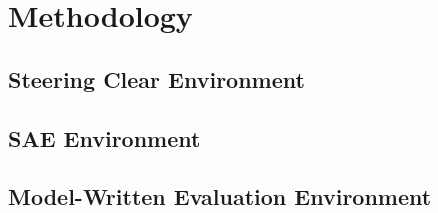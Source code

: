 \chapter{Methodology}

\section{Steering Clear Environment}

\section{SAE Environment}

\section{Model-Written Evaluation Environment}
